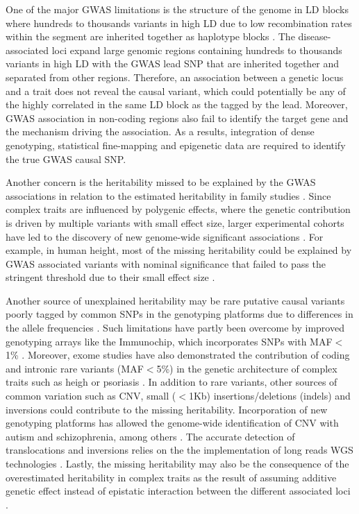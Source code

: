 One of the major GWAS limitations is the structure of the genome in LD blocks where hundreds to thousands variants in high LD due to low recombination rates within the segment are inherited together as haplotype blocks \parencite{}. The disease-associated loci expand large genomic regions containing hundreds to thousands variants in high LD with the GWAS lead SNP that are inherited together and separated from other regions. Therefore, an association between a genetic locus and a trait does not reveal the causal variant, which could potentially be any of the highly correlated in the same LD block as the tagged by the lead. Moreover, GWAS association in non-coding regions also fail to identify the target gene and the mechanism driving the association. As a results, integration of dense genotyping, statistical fine-mapping and epigenetic data are required to identify the true GWAS causal SNP.

Another concern is the heritability missed to be explained by the GWAS associations in relation to the estimated heritability in family studies \parencite{Ku2010, Yang2010}. Since complex traits are influenced by polygenic effects, where the genetic contribution is driven by multiple variants with small effect size, larger experimental cohorts have led to the discovery of new genome-wide significant associations \parencite{Visscher2017}. For example, in human height, most of the missing heritability could be explained by GWAS associated variants with nominal significance that failed to pass the stringent threshold due to their small effect size \parencite{Yang2010}. 

Another source of unexplained heritability may be rare putative causal variants poorly tagged by common SNPs in the genotyping platforms due to differences in the allele frequencies \parencite{Wray2005}. Such limitations have partly been overcome by improved genotyping arrays like the Immunochip, which incorporates SNPs with MAF${<}$1\% \parencite{Cortes2011}. Moreover, exome studies have also demonstrated the contribution of coding and intronic rare variants (MAF${<}$5\%) in the genetic architecture of complex traits such as heigh or psoriasis \parencite{ Marouli2017, Dand2017}. In addition to rare variants, other sources of common variation such as CNV, small ($<$1Kb) insertions/deletions (indels) and inversions could contribute to the missing heritability. Incorporation of new genotyping platforms has allowed the genome-wide identification of CNV with autism and schizophrenia, among others \parencite{Glessner2009,Marshall2017}. The accurate detection of translocations and inversions relies on the the implementation of long reads WGS technologies \parencite{Visscher2017}. Lastly, the missing heritability may also be the consequence of the overestimated heritability in complex traits as the result of assuming additive genetic effect instead of epistatic interaction between the different associated loci \parencite{Zuk2012}. 




